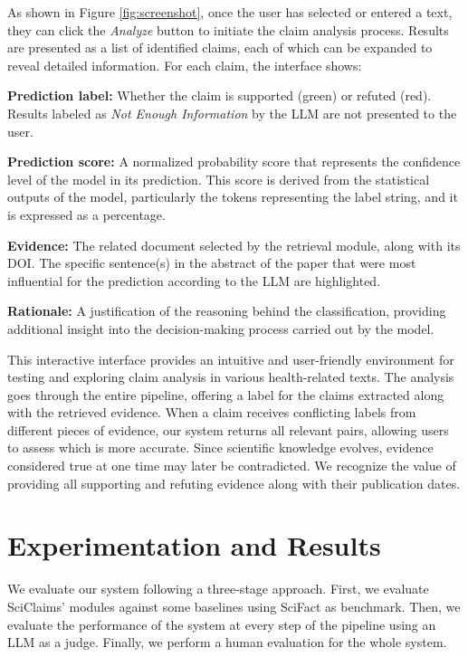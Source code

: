 \documentclass[11pt]{article}
\begin{document}
As shown in Figure \ref{fig:screenshot}, once the user has selected or entered a text, they can click the \textit{Analyze} button to initiate the claim analysis process. Results are presented as a list of identified claims, each of which can be expanded to reveal detailed information. For each claim, the interface shows:

\textbf{Prediction label:} Whether the claim is supported (green) or refuted (red). Results labeled as \textit{Not Enough Information} by the LLM are not presented to the user.

\textbf{Prediction score:} A normalized probability score that represents the confidence level of the model in its prediction. This score is derived from the statistical outputs of the model, particularly the tokens representing the label string, and it is expressed as a percentage.

\textbf{Evidence:} The related document selected by the retrieval module, along with its DOI. The specific sentence(s) in the abstract of the paper that were most influential for the prediction according to the LLM are highlighted.

\textbf{Rationale:} A justification of the reasoning behind the classification, providing additional insight into the decision-making process carried out by the model.

This interactive interface provides an intuitive and user-friendly environment for testing and exploring claim analysis in various health-related texts. The analysis goes through the entire pipeline, offering a label for the claims extracted along with the retrieved evidence. When a claim receives conflicting labels from different pieces of evidence, our system returns all relevant pairs, allowing users to assess which is more accurate. Since scientific knowledge evolves, evidence considered true at one time may later be contradicted. We recognize the value of providing all supporting and refuting evidence along with their publication dates.

\section{Experimentation and Results}
\label{sec:exp}
We evaluate our system following a three-stage approach. First, we evaluate SciClaims' modules against some baselines using SciFact as benchmark. Then, we evaluate the performance of the system at every step of the pipeline using an LLM as a judge. Finally, we perform a human evaluation for the whole system.
\end{document}
